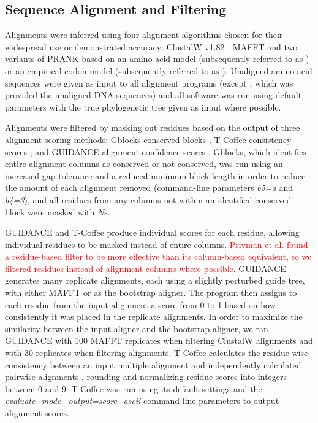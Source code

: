 \documentclass{article}
\begin{document}
\subsection*{Sequence Alignment and Filtering}

Alignments were inferred using four alignment algorithms chosen for
their widespread use or demonstrated accuracy: ClustalW v1.82
\citep{Thompson1994ClustalW}, MAFFT \citep{Katoh2005MAFFT} and two
variants of PRANK \citep{Loytynoja2005From} based on an amino acid
model (subsequently referred to as \pranka{}) or an empirical codon
model (subsequently referred to as \prankc{}). Unaligned amino acid
sequences were given as input to all alignment programs (except
\prankc{}, which was provided the unaligned DNA sequences) and all
software was run using default parameters with the true phylogenetic
tree given as input where possible.

Alignments were filtered by masking out residues based on the output
of three alignment scoring methods: Gblocks conserved blocks
\citep{Castresana2000Selection}, T-Coffee consistency scores
\citep{Notredame2000TCoffee,Notredame2003Using}, and GUIDANCE
alignment confidence scores \citep{Penn2010Alignment}. Gblocks, which
identifies entire alignment columns as conserved or not conserved, was
run using an increased gap tolerance and a reduced minimum block
length in order to reduce the amount of each alignment removed
(command-line parameters {\em b5=a} and {\em b4=3}), and all residues
from any columns not within an identified conserved block were masked
with $N$s.

GUIDANCE and T-Coffee produce individual scores for each residue,
allowing individual residues to be masked instead of entire
columns. \textcolor{red}{Privman et al. \citeyearpar{Privman2011Improving} found a
residue-based filter to be more effective than its column-based
equivalent, so we filtered residues instead of alignment columns where
possible}. GUIDANCE generates many replicate alignments, each using a
slightly perturbed guide tree, with either MAFFT or \pranka as the
bootstrap aligner. The program then assigns to each residue from the
input alignment a score from 0 to 1 based on how consistently it was
placed in the replicate alignments. In order to maximize the
similarity between the input aligner and the bootstrap aligner, we ran
GUIDANCE with 100 MAFFT replicates when filtering ClustalW alignments
and with 30 \pranka replicates when filtering \prankc
alignments. T-Coffee calculates the residue-wise consistency between
an input multiple alignment and independently calculated pairwise
alignments \citep{Notredame2003Using}, rounding and normalizing
residue scores into integers between 0 and 9. T-Coffee was run using
its default settings and the {\em evaluate\_mode
  --output=score\_ascii} command-line parameters to output alignment
scores.
\end{document}
